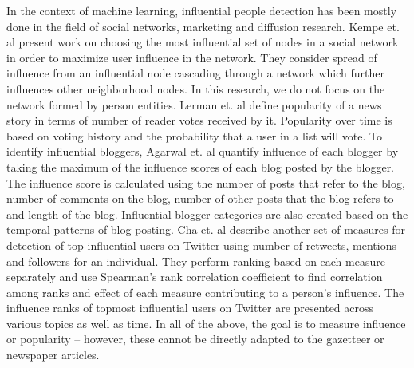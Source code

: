 In the context of machine learning, influential people detection has been mostly done in the field of social networks, marketing and diffusion research.
Kempe et. al \cite{kempe2003maximizing} present work on choosing the most influential set of nodes in a social network in order to maximize user influence in the network. They consider spread of influence from an influential node cascading through a network which further influences other neighborhood nodes. In this research, we do not focus on the network formed by person entities. Lerman et. al \cite{lerman2010using} define popularity of a news story in terms of number of reader votes received by it. Popularity over time is based on voting history and the probability that a user in a list will vote. To identify influential bloggers, Agarwal et. al\cite{agarwal2008identifying} quantify influence of each blogger by taking the maximum of the influence scores of each blog posted by the blogger. The influence score is calculated using the number of posts that refer to the blog, number of comments on the blog, number of other posts that the blog refers to and length of the blog. Influential blogger categories are also created based on the temporal patterns of blog posting. Cha et. al\cite{cha2010measuring} describe another set of measures for detection of top influential users on Twitter using number of retweets, mentions and followers for an individual. They perform ranking based on each measure separately and use Spearman's rank correlation coefficient to find correlation among ranks and effect of each measure contributing to a person's influence. The influence ranks of topmost influential users on Twitter are presented across various topics as well as time. In all of the above, the goal is to measure influence or popularity -- however, these cannot be directly adapted to the gazetteer or newspaper articles. 